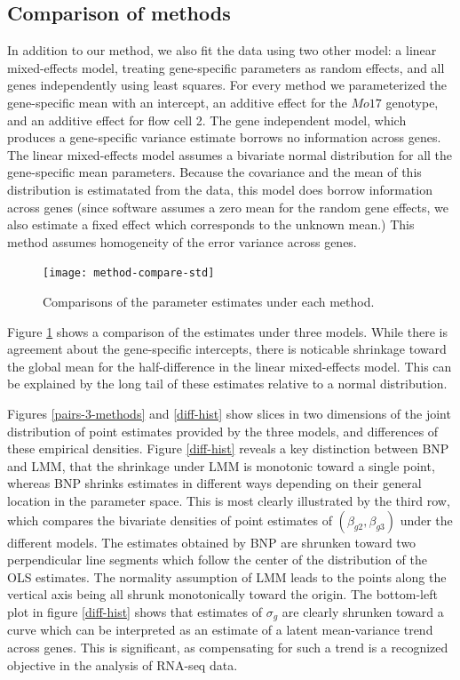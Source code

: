 {\subsection{Comparison of methods}
In addition to our method, we also fit the data using two other model: a linear mixed-effects model, treating gene-specific parameters as random effects, and all genes independently using least squares. For every method we parameterized the gene-specific mean with an intercept, an additive effect for the $Mo17$ genotype, and an additive effect for flow cell 2. The gene independent model, which produces a gene-specific variance estimate borrows no information across genes. The linear mixed-effects model assumes a bivariate normal distribution for all the gene-specific mean parameters. Because the covariance and the mean of this distribution is estimatated from the data, this model does borrow information across genes (since software assumes a zero mean for the random gene effects, we also estimate a fixed effect which corresponds to the unknown mean.) This method assumes homogeneity of the error variance across genes.

\begin{figure}
\centering
\texttt{[image: method-compare-std]}
\caption{Comparisons of the parameter estimates under each method.}
\label{method-compare}
\end{figure}
Figure  \ref{method-compare} shows a comparison of the estimates under three models. While there is agreement about the gene-specific intercepts, there is noticable shrinkage toward the global mean for the half-difference in the linear mixed-effects model. This can be explained by the long tail of these estimates relative to a normal distribution.

Figures \ref{pairs-3-methods} and \ref{diff-hist} show slices in two dimensions of the joint distribution of point estimates provided by the three models, and differences of these empirical densities. Figure \ref{diff-hist} reveals a key distinction between BNP and LMM, that the shrinkage under LMM is monotonic toward a single point, whereas BNP shrinks estimates in different ways depending on their general location in the parameter space. This is most clearly illustrated by the third row, which compares the bivariate densities of point estimates of $(\beta_{g2},\beta_{g3})$ under the different models. The estimates obtained by BNP are shrunken toward two perpendicular line segments which follow the center of the distribution of the OLS estimates. The normality assumption of LMM leads to the points along the vertical axis being all shrunk monotonically toward the origin. The bottom-left plot in figure \ref{diff-hist} shows that estimates of $\sigma_g$ are clearly shrunken toward a curve which can be interpreted as an estimate of a latent mean-variance trend across genes. This is significant, as compensating for such a trend is a recognized objective in the analysis of RNA-seq data.

}
